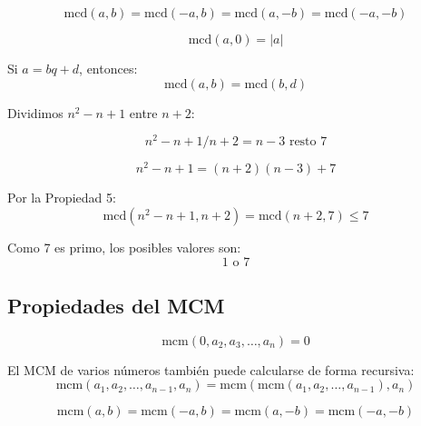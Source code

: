 \documentclass[a4paper,12pt]{article}
\begin{document}
\begin{procedimiento}[title={Propiedad 3}]
\[
\text{mcd}(a,b) = \text{mcd}(-a,b) = \text{mcd}(a,-b) = \text{mcd}(-a,-b)
\]
\end{procedimiento}

\begin{procedimiento}[title={Propiedad 4}]
\[
\text{mcd}(a,0) = |a|
\]
\end{procedimiento}

\begin{procedimiento}[title={Propiedad 5}]
Si \( a = bq + d \), entonces:
\[
\text{mcd}(a,b) = \text{mcd}(b,d)
\]
\end{procedimiento}

\begin{ejemplo}[title={Ejemplo de uso: Valores de $\text{mcd}(n^2-n+1,n+2)$ en $\mathbb{Z}$}]
Dividimos \(n^2 - n + 1\) entre \(n+2\):

\[
n^2-n+1 / n+2 = n-3 \text{ resto } 7
\]

\[
n^2 - n + 1 = (n+2)(n-3) + 7
\]

Por la Propiedad 5:
\[
\text{mcd}(n^2 - n + 1, n+2) = \text{mcd}(n+2,7) \le 7
\]

Como 7 es primo, los posibles valores son:
\[
\boxed{1 \text{ o } 7}
\]
\end{ejemplo}



\subsection{Propiedades del MCM}

\begin{procedimiento}[title={Propiedad 1}]
\[
\text{mcm}(0,a_2,a_3,\ldots,a_n) = 0
\]
\end{procedimiento}

\begin{procedimiento}[title={Propiedad 2}]
El MCM de varios números también puede calcularse de forma recursiva:
\[
\text{mcm}(a_1,a_2,\ldots,a_{n-1},a_n) = \text{mcm}(\text{mcm}(a_1,a_2,\ldots,a_{n-1}),a_n)
\]
\end{procedimiento}

\begin{procedimiento}[title={Propiedad 3}]
\[
\text{mcm}(a,b) = \text{mcm}(-a,b) = \text{mcm}(a,-b) = \text{mcm}(-a,-b)
\]
\end{procedimiento}
\end{document}
